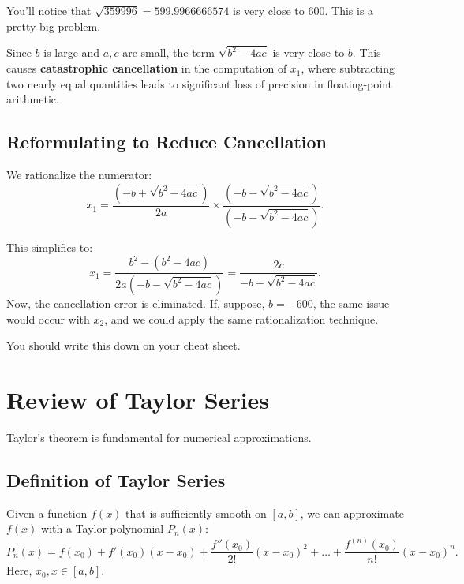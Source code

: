 You'll notice that $\sqrt{359996} = 599.9966666574$ is very close to $600$. This
is a pretty big problem.

Since $b$ is large and $a, c$ are small, the term $\sqrt{b^2 - 4ac}$
is very close to $b$. This causes \textbf{catastrophic cancellation} in the
computation of $x_1$, where subtracting two nearly equal quantities leads to
significant loss of precision in floating-point arithmetic.


\subsection{Reformulating to Reduce Cancellation}

We rationalize the numerator:
\begin{equation*}
    x_1 = \frac{(-b + \sqrt{b^2 - 4ac})}{2a} \times 
          \frac{(-b - \sqrt{b^2 - 4ac})}{(-b - \sqrt{b^2 - 4ac})}.
\end{equation*}

This simplifies to:
\begin{equation*}
    x_1 = \frac{b^2 - (b^2 - 4ac)}{2a(-b - \sqrt{b^2 - 4ac})} = 
    \frac{2c}{-b - \sqrt{b^2 - 4ac}}.
\end{equation*}
Now, the cancellation error is eliminated. If, suppose, $b = -600$, the same 
issue would occur with $x_2$, and we could apply the same rationalization
technique.

\tiny You should write this down on your cheat sheet.\normalsize

\section{Review of Taylor Series}

Taylor’s theorem is fundamental for numerical approximations.

\subsection{Definition of Taylor Series}

\begin{minipage}{\textwidth}
Given a function $f(x)$ that is sufficiently smooth on $[a, b]$, we can 
approximate $f(x)$ with a Taylor polynomial $P_n(x)$:
\begin{equation*}
    P_n(x) = f(x_0) + f'(x_0)(x - x_0) + \frac{f''(x_0)}{2!} (x - x_0)^2 + 
             \dots + \frac{f^{(n)}(x_0)}{n!} (x - x_0)^n.
\end{equation*}
Here, $x_0, x \in [a, b]$.
\end{minipage}

